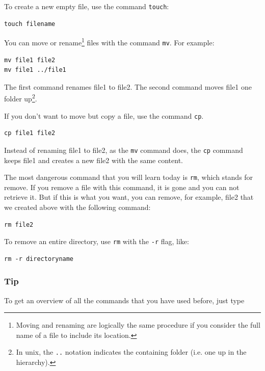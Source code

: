 \documentclass[11pt]{article}
\begin{document}
To create a new empty file, use the command \texttt{touch}:

\begin{verbatim}
touch filename
\end{verbatim}

You can move or rename\footnote{Moving and renaming are logically the same procedure if you 
consider the full name of a file to include its location.} files with the command \texttt{mv}. For example:

\begin{verbatim}
mv file1 file2
mv file1 ../file1
\end{verbatim}

The first command renames file1 to file2. The second command moves
file1 one folder up\footnote{In unix, the \texttt{..} notation indicates the containing folder
(i.e. one up in the hierarchy).}.

If you don't want to move but copy a file, use the command \texttt{cp}.

\begin{verbatim}
cp file1 file2
\end{verbatim}

Instead of renaming file1 to file2, as the \texttt{mv} command does, the \texttt{cp}
command keeps file1 and creates a new file2 with the same content.

The most dangerous command that you will learn today is \texttt{rm}, which stands
for remove. If you remove a file with this command, it is gone and you
can not retrieve it. But if this is what you want, you can remove, for
example, file2 that we created above with the following command:


\begin{verbatim}
rm file2
\end{verbatim}

To remove an entire directory, use \texttt{rm} with the \texttt{-r} flag, like:

\begin{verbatim}
rm -r directoryname
\end{verbatim}

\subsubsection{Tip}
\label{sec:orgheadline9}
To get an overview of all the commands that you have used before, just
type
\end{document}
